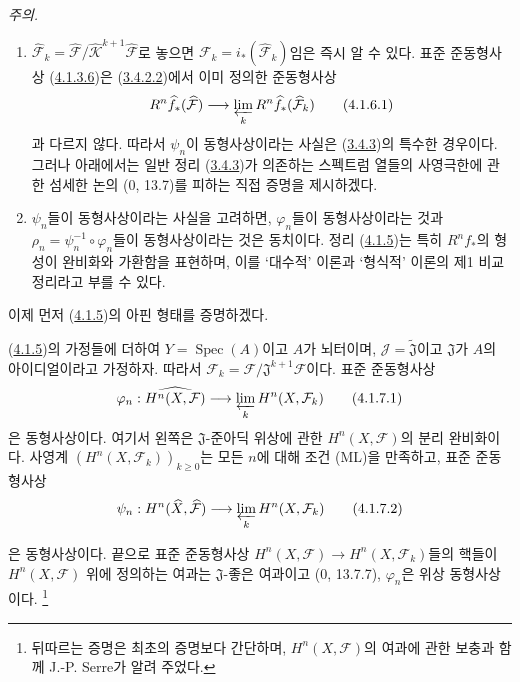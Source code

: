 \begin{env}[4.1.6]
\label{III.4.1.6-fr}
\emph{주의.}
\begin{enumerate}
\item[(i)]
$\widehat{\mathcal F}_k=
\widehat{\mathcal F}/\widehat{\mathcal K}^{k+1}\widehat{\mathcal F}$로
놓으면 $\mathcal F_k=i_*(\widehat{\mathcal F}_k)$임은 즉시 알 수 있다.
표준 준동형사상 (\hyperref[III.4.1.3.6-fr]{4.1.3.6})은
(\hyperref[III.3.4.2.2-fr]{3.4.2.2})에서 이미 정의한 준동형사상
\[
R^n\widehat f_*(\widehat{\mathcal F})
\longrightarrow\varprojlim_kR^n\widehat f_*(\widehat{\mathcal F}_k)
\tag{4.1.6.1}\label{III.4.1.6.1-fr}
\]
과 다르지 않다. 따라서 $\psi_n$이 동형사상이라는 사실은
(\hyperref[III.3.4.3-fr]{3.4.3})의 특수한 경우이다. 그러나 아래에서는
일반 정리 (\hyperref[III.3.4.3-fr]{3.4.3})가 의존하는 스펙트럼 열들의
사영극한에 관한 섬세한 논의 (0, 13.7)를 피하는 직접 증명을 제시하겠다.

\item[(ii)]
$\psi_n$들이 동형사상이라는 사실을 고려하면, $\varphi_n$들이
동형사상이라는 것과
$\rho_n=\psi_n^{-1}\circ\varphi_n$들이 동형사상이라는 것은 동치이다.
정리 (\hyperref[III.4.1.5-fr]{4.1.5})는 특히 $R^nf_*$의 형성이
완비화와 가환함을 표현하며, 이를 ‘대수적’ 이론과 ‘형식적’ 이론의
제1 비교 정리라고 부를 수 있다.
\end{enumerate}
이제 먼저 (\hyperref[III.4.1.5-fr]{4.1.5})의 아핀 형태를 증명하겠다.
\end{env}

\begin{corollary}[4.1.7]
\label{III.4.1.7-fr}
(\hyperref[III.4.1.5-fr]{4.1.5})의 가정들에 더하여
$Y=\operatorname{Spec}(A)$이고 $A$가 뇌터이며,
$\mathcal J=\widetilde{\mathfrak J}$이고 $\mathfrak J$가 $A$의
아이디얼이라고 가정하자. 따라서
$\mathcal F_k=\mathcal F/\mathfrak J^{k+1}\mathcal F$이다. 표준
준동형사상
\[
\varphi_n:\widehat{H^n(X,\mathcal F)}
\longrightarrow\varprojlim_kH^n(X,\mathcal F_k)
\tag{4.1.7.1}\label{III.4.1.7.1-fr}
\]
은 동형사상이다. 여기서 왼쪽은 $\mathfrak J$-준아딕 위상에 관한
$H^n(X,\mathcal F)$의 분리 완비화이다. 사영계
$(H^n(X,\mathcal F_k))_{k\geq0}$는 모든 $n$에 대해 조건 (ML)을
만족하고, 표준 준동형사상
\[
\psi_n:H^n(\widehat X,\widehat{\mathcal F})
\longrightarrow\varprojlim_kH^n(X,\mathcal F_k)
\tag{4.1.7.2}\label{III.4.1.7.2-fr}
\]


은 동형사상이다. 끝으로 표준 준동형사상
$H^n(X,\mathcal F)\to H^n(X,\mathcal F_k)$들의 핵들이
$H^n(X,\mathcal F)$ 위에 정의하는 여과는 $\mathfrak J$-좋은 여과이고
(0, 13.7.7), $\varphi_n$은 위상 동형사상이다.
\footnote{뒤따르는 증명은 최초의 증명보다 간단하며,
$H^n(X,\mathcal F)$의 여과에 관한 보충과 함께 J.-P. Serre가
알려 주었다.}
\end{corollary}

